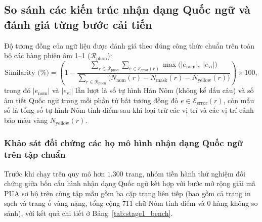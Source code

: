 \subsection{So sánh các kiến trúc nhận dạng Quốc ngữ và đánh giá từng bước cải tiến}

Độ tương đồng của ngữ liệu được đánh giá theo đúng công thức chuẩn trên toàn bộ các hàng phiên âm 1--1 ($\mathcal{R}_{\text{phon}}$):
\begin{equation}
    \text{Similarity (\%)} = \left(1 - \frac{\sum_{r \in \mathcal{R}_{\text{phon}}} \sum_{e \in \mathcal{E}_{\text{error}}(r)} \max\big(|e_{\text{nom}}|,\; |e_{\text{vi}}|\big)}{\sum_{r \in \mathcal{R}_{\text{phon}}} \big(N_{\text{nom}}(r) - N_{\text{mask}}(r) - N_{\text{yellow}}(r)\big)}\right) \times 100,
\end{equation}
trong đó $|e_{\text{nom}}|$ và $|e_{\text{vi}}|$ lần lượt là số tự hình Hán Nôm (không kể dấu câu) và số âm tiết Quốc ngữ trong mỗi phần tử bất tương đồng đỏ $e \in \mathcal{E}_{\text{error}}(r)$, còn mẫu số là tổng số tự hình Nôm tính điểm sau khi loại trừ các vị trí \code{[MASK]} và các vị trí cảnh báo màu vàng $N_{\text{yellow}}(r)$.

\subsubsection{Khảo sát đối chứng các họ mô hình nhận dạng Quốc ngữ trên tập chuẩn}

Trước khi chạy trên quy mô hơn $1.300$ trang, nhóm tiến hành thử nghiệm đối chứng giữa bốn cấu hình nhận dạng Quốc ngữ kết hợp với bước mở rộng giải mã PUA sơ bộ trên cùng tập mẫu gồm ba cặp trang liên tiếp (bao gồm cả trang in sạch và trang ố vàng nặng, tổng cộng $711$ chữ Nôm tính điểm và $0$ hàng không so sánh), với kết quả chi tiết ở Bảng~\ref{tab:stage1_bench}.

